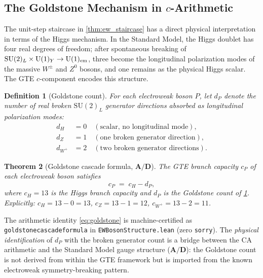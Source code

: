\documentclass[11pt]{article}
\newtheorem{theorem}{Theorem}[section]
\newtheorem{definition}[theorem]{Definition}
\theoremstyle{remark}
\newcommand{\cH}{c_H}
\newcommand{\lean}[1]{%
  \penalty-100
  \begingroup\def\_{\textunderscore\allowbreak}\texttt{#1}\endgroup}
\newcommand{\CatAD}{\textbf{A/D}}
\begin{document}
\subsection{The Goldstone Mechanism in \texorpdfstring{$c$}{c}-Arithmetic}
\label{sec:ew_goldstone}

The unit-step staircase in \cref{thm:ew_staircase} has a direct physical interpretation
in terms of the Higgs mechanism.
In the Standard Model, the Higgs doublet has four real degrees of freedom; after spontaneous
breaking of $\mathrm{SU}(2)_L \times \mathrm{U}(1)_Y \to \mathrm{U}(1)_{\rm em}$, three
become the longitudinal polarization modes of the massive $W^\pm$ and $Z^0$ bosons, and one
remains as the physical Higgs scalar.
The GTE $c$-component encodes this structure.

\begin{definition}[Goldstone count]\label{def:goldstone_count}
For each electroweak boson $P$, let $d_P$ denote the number of real broken
$\mathrm{SU}(2)_L$ generator directions absorbed as longitudinal polarization modes:
\begin{align*}
d_H &= 0\quad(\text{scalar, no longitudinal mode}),\\
d_Z &= 1\quad(\text{one broken generator direction}),\\
d_{W^+} &= 2\quad(\text{two broken generator directions}).
\end{align*}
\end{definition}

\begin{theorem}[Goldstone cascade formula, $\CatAD$]\label{thm:goldstone}
The GTE branch capacity $c_P$ of each electroweak boson satisfies
\begin{equation}
c_P \;=\; \cH - d_P,
\label{eq:goldstone}
\end{equation}
where $\cH = 13$ is the Higgs branch capacity and $d_P$ is the Goldstone count of \cref{def:goldstone_count}.
Explicitly: $c_H = 13 - 0 = 13$, $c_Z = 13 - 1 = 12$, $c_{W^+} = 13 - 2 = 11$.
\end{theorem}

The arithmetic identity \eqref{eq:goldstone} is machine-certified as
\lean{goldstone\_cascade\_formula} in \lean{EWBosonStructure.lean}
(zero \texttt{sorry}).
The \emph{physical identification} of $d_P$ with the broken generator count is a
bridge between the CA arithmetic and the Standard Model gauge structure ($\CatAD$):
the Goldstone count is not derived from within the GTE framework but is imported
from the known electroweak symmetry-breaking pattern.
\end{document}
